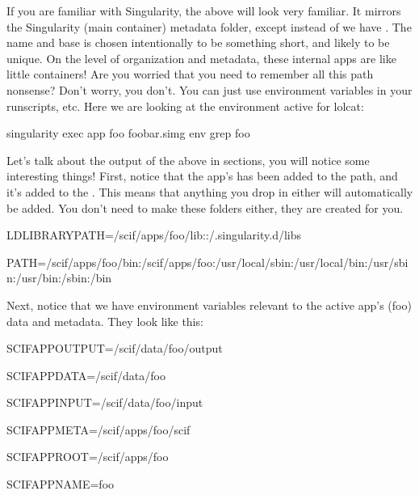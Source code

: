 \documentclass[letterpaper,10pt,english]{sphinxmanual}
\begin{document}
If you are familiar with Singularity, the above will look very familiar.
It mirrors the Singularity (main container) metadata folder, except
instead of  we have . The name and base  is chosen intentionally to be
something short, and likely to be unique. On the level of organization
and metadata, these internal apps are like little containers! Are you
worried that you need to remember all this path nonsense? Don’t worry,
you don’t. You can just use environment variables in your runscripts,
etc. Here we are looking at the environment active for lolcat:

%
\begin{sphinxVerbatim}[commandchars=\\\{\}]
singularity exec \PYGZhy{}\PYGZhy{}app foo foobar.simg env \textbar{} grep foo
\end{sphinxVerbatim}

Let’s talk about the output of the above in sections, you will notice
some interesting things! First, notice that the app’s  has been added to
the path, and it’s  added to the  . This means that anything you drop in
either will automatically be added. You don’t need to make these folders
either, they are created for you.

%
\begin{sphinxVerbatim}[commandchars=\\\{\}]
LD\PYGZus{}LIBRARY\PYGZus{}PATH=/scif/apps/foo/lib::/.singularity.d/libs

PATH=/scif/apps/foo/bin:/scif/apps/foo:/usr/local/sbin:/usr/local/bin:/usr/sbin:/usr/bin:/sbin:/bin
\end{sphinxVerbatim}

Next, notice that we have environment variables relevant to the active
app’s (foo) data and metadata. They look like this:

%
\begin{sphinxVerbatim}[commandchars=\\\{\}]
SCIF\PYGZus{}APPOUTPUT=/scif/data/foo/output

SCIF\PYGZus{}APPDATA=/scif/data/foo

SCIF\PYGZus{}APPINPUT=/scif/data/foo/input

SCIF\PYGZus{}APPMETA=/scif/apps/foo/scif

SCIF\PYGZus{}APPROOT=/scif/apps/foo

SCIF\PYGZus{}APPNAME=foo
\end{sphinxVerbatim}
\end{document}
